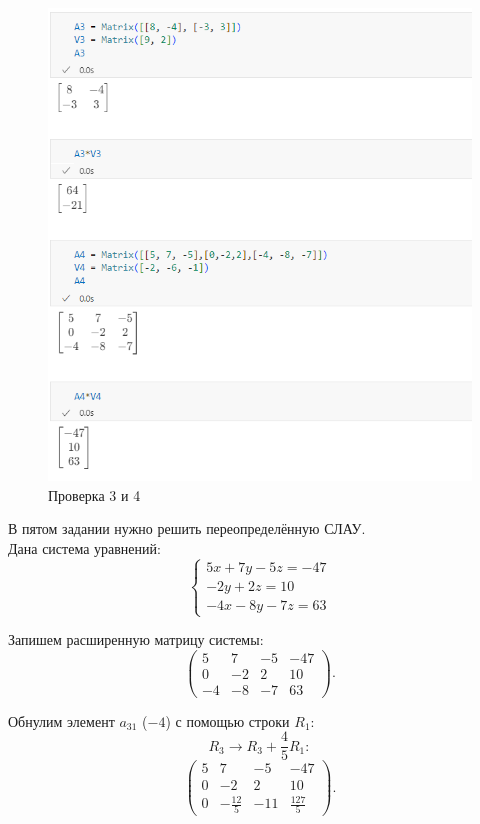 \documentclass[14pt,a4paper]{extarticle}
\begin{document}
\begin{figure}[h!]
    \centering
    \includegraphics[scale=0.6]{pic8/2.2.png}
    \caption{Проверка 3 и 4}
    \label{pic:34}
\end{figure}
\FloatBarrier

В пятом задании нужно решить переопределённую СЛАУ.\\

Дана система уравнений:
\[
\begin{cases}
5x + 7y - 5z = -47 \\
-2y + 2z = 10 \\
-4x - 8y - 7z = 63
\end{cases}
\]

Запишем расширенную матрицу системы:
\[
\left(\begin{array}{ccc|c}
5 & 7 & -5 & -47 \\
0 & -2 & 2 & 10 \\
-4 & -8 & -7 & 63
\end{array}\right)
.\]

Обнулим элемент $a_{31}$ ($-4$) с помощью строки $R_1$:
\[
R_3 \rightarrow R_3 + \frac{4}{5}R_1
:\]
\[
\left(\begin{array}{ccc|c}
5 & 7 & -5 & -47 \\
0 & -2 & 2 & 10 \\
0 & -\frac{12}{5} & -11 & \frac{127}{5}
\end{array}\right)
.\]
\end{document}

